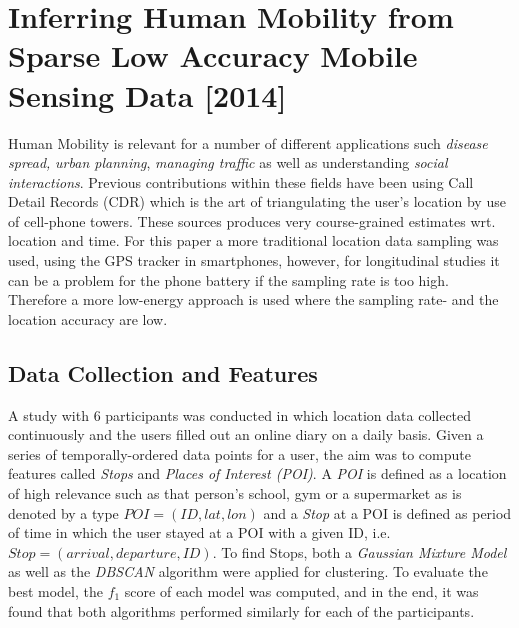 \section{Inferring Human Mobility from Sparse Low Accuracy Mobile Sensing Data [2014]}
Human Mobility is relevant for a number of different applications such \textit{disease spread,} \textit{urban planning}, \textit{managing traffic }as well as understanding \textit{social interactions}. Previous contributions within these fields have been using Call Detail Records (CDR) which is the art of triangulating the user's location by use of cell-phone towers. These sources produces very course-grained estimates wrt. location and time. For this paper a more traditional location data sampling was used, using the GPS tracker in smartphones, however, for longitudinal studies it can be a problem for the phone battery if the sampling rate is too high. Therefore a more low-energy approach is used where the sampling rate- and the location accuracy are low. 

\subsection{Data Collection and Features}
A study with 6 participants was conducted in which location data collected continuously and the users filled out an online diary on a daily basis. Given a series of temporally-ordered data points for a user, the aim was to compute features called \textit{Stops} and \textit{Places of Interest (POI)}. A \textit{POI} is defined as a location of high relevance such as that person's school, gym or a supermarket as is denoted by a type $POI = (ID, lat, lon)$ and a \textit{Stop} at a POI is defined as period of time in which the user stayed at a POI with a given ID, i.e. $Stop = (arrival, departure, ID)$. To find Stops, both a \textit{Gaussian Mixture Model} as well as the \textit{DBSCAN} algorithm were applied for clustering. To evaluate the best model, the $f_1$ score of each model was computed, and in the end, it was found that both algorithms performed similarly for each of the participants. 